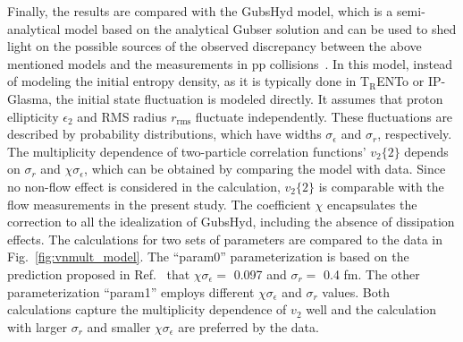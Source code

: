 Finally, the results are compared with the GubsHyd model, which is a semi-analytical model based on the analytical Gubser solution and can be used to shed light on the possible sources of the observed discrepancy between the above mentioned models and the measurements in pp collisions~\cite{Taghavi:2019mqz}. In this model, instead of modeling the initial entropy density, as it is typically done in T$_{\text{R}}$ENTo or IP-Glasma, the initial state fluctuation is modeled directly. It assumes that proton ellipticity $\epsilon_{2}$ and RMS radius $r_{\text{rms}}$ fluctuate independently. These fluctuations are described by probability distributions, which have widths $\sigma_{\epsilon}$
 and $\sigma_{r}$, respectively. The multiplicity dependence of two-particle correlation functions' $v_2\{2\}$ depends on $\sigma_{r}$ and  $\chi\sigma_{\epsilon}$, which can be obtained by comparing the model with data. Since no non-flow effect is considered in the calculation, $v_2\{2\}$ is comparable with the flow measurements in the present study. The coefficient $\chi$ encapsulates the correction to all the idealization of GubsHyd, including the absence of dissipation effects. The calculations for two sets of parameters are compared
to the data in Fig.~\ref{fig:vnmult_model}. The “param0” parameterization is based on the prediction proposed in Ref.~\cite{Taghavi:2019mqz} that $\chi \sigma_{\epsilon} =$ 0.097 and $\sigma_{r} =$ 0.4 fm. The other parameterization “param1” employs different $\chi \sigma_{\epsilon}$  and $\sigma_{r}$ values. Both calculations capture the multiplicity dependence of $v_2$ well and the calculation with larger $\sigma_{r}$ and smaller $\chi \sigma_{\epsilon}$ are preferred by the data.
 
